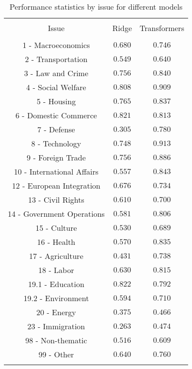 
\begin{table}[!htbp] \centering 
  \caption{Performance statistics by issue for different models} 
  \label{tab:issue_eval_transfer_ridge_transfer} 
\begin{tabular}{@{\extracolsep{5pt}} ccc} 
\\[-1.8ex]\hline 
\hline \\[-1.8ex] 
Issue & Ridge & Transformers \\ 
\hline \\[-1.8ex] 
1 - Macroeconomics & $0.680$ & $0.746$ \\ 
2 - Transportation & $0.549$ & $0.640$ \\ 
3 - Law and Crime & $0.756$ & $0.840$ \\ 
4 - Social Welfare & $0.808$ & $0.909$ \\ 
5 - Housing & $0.765$ & $0.837$ \\ 
6 - Domestic Commerce & $0.821$ & $0.813$ \\ 
7 - Defense & $0.305$ & $0.780$ \\ 
8 - Technology & $0.748$ & $0.913$ \\ 
9 - Foreign Trade & $0.756$ & $0.886$ \\ 
10 - International Affairs & $0.557$ & $0.843$ \\ 
12 - European Integration & $0.676$ & $0.734$ \\ 
13 - Civil Rights & $0.610$ & $0.700$ \\ 
14 - Government Operations & $0.581$ & $0.806$ \\ 
15 - Culture & $0.530$ & $0.689$ \\ 
16 - Health & $0.570$ & $0.835$ \\ 
17 - Agriculture & $0.431$ & $0.738$ \\ 
18 - Labor & $0.630$ & $0.815$ \\ 
19.1 - Education & $0.822$ & $0.792$ \\ 
19.2 - Environment & $0.594$ & $0.710$ \\ 
20 - Energy & $0.375$ & $0.466$ \\ 
23 - Immigration & $0.263$ & $0.474$ \\ 
98 - Non-thematic & $0.516$ & $0.609$ \\ 
99 - Other & $0.640$ & $0.760$ \\ 
\hline \\[-1.8ex] 
\end{tabular} 
\end{table} 

